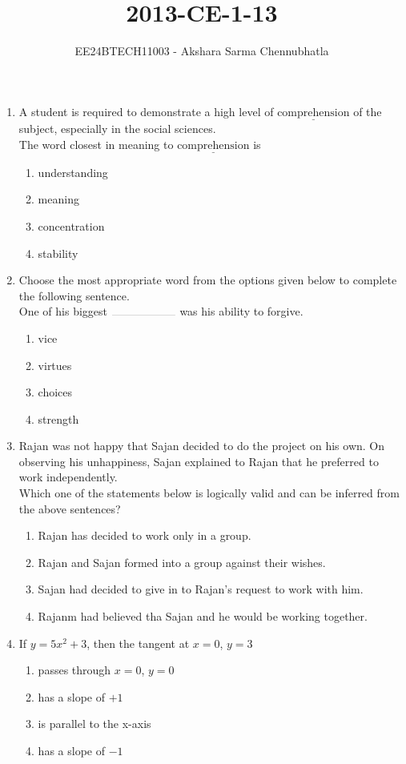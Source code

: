 \documentclass[journal,12pt,onecolumn]{IEEEtran}
\theoremstyle{remark}
\begin{document}

\title{2013-CE-1-13}
\author{EE24BTECH11003 - Akshara Sarma Chennubhatla}
\maketitle
\begin{enumerate}
\item A student is required to demonstrate a high level of $\underline{\text{comprehension}}$ of the subject, especially in the social sciences.\\
The word closest in meaning to $\underline{\text{comprehension}}$ is
\begin{enumerate}
\item understanding
\item meaning
\item concentration
\item stability
\end{enumerate}

\item Choose the most appropriate word from the options given below to complete the following sentence.\\
One of his biggest $\rule{2cm}{0.1pt}$ was his ability to forgive.
\begin{enumerate}
\item vice
\item virtues
\item choices
\item strength
\end{enumerate}

\item Rajan was not happy that Sajan decided to do the project on his own. On observing his unhappiness, Sajan explained to Rajan that he preferred to work independently.\\
Which one of the statements below is logically valid and can be inferred from the above sentences?
\begin{enumerate}
\item Rajan has decided to work only in a group.
\item Rajan and Sajan formed into a group against their wishes.
\item Sajan had decided to give in to Rajan's request to work with him.
\item Rajanm had believed tha Sajan and he would be working together.
\end{enumerate}

\item If $y = 5x^2 + 3$, then the tangent at $x = 0$, $y = 3$
\begin{enumerate}
\item passes through $x=0$, $y=0$
\item has a slope of $+1$
\item is parallel to the x-axis
\item has a slope of $-1$
\end{enumerate}


\end{enumerate}
\end{document}
